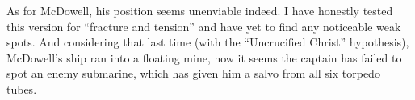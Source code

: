 As for McDowell, his position seems unenviable indeed. I have honestly tested this version for ``fracture and tension'' and have yet to find any noticeable weak spots. And considering that last time (with the ``Uncrucified Christ'' hypothesis), McDowell's ship ran into a floating mine, now it seems the captain has failed to spot an enemy submarine, which has given him a salvo from all six torpedo tubes.